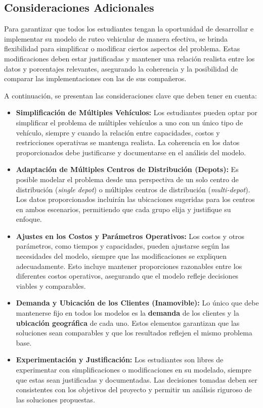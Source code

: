 \documentclass[12pt]{article}
\begin{document}
\subsection{Consideraciones Adicionales}

Para garantizar que todos los estudiantes tengan la oportunidad de desarrollar e implementar su modelo de ruteo vehicular de manera efectiva, se brinda flexibilidad para simplificar o modificar ciertos aspectos del problema. Estas modificaciones deben estar justificadas y mantener una relación realista entre los datos y porcentajes relevantes, asegurando la coherencia y la posibilidad de comparar las implementaciones con las de sus compañeros.

A continuación, se presentan las consideraciones clave que deben tener en cuenta:

\begin{itemize}
    \item \textbf{Simplificación de Múltiples Vehículos:}  
    Los estudiantes pueden optar por simplificar el problema de múltiples vehículos a uno con un único tipo de vehículo, siempre y cuando la relación entre capacidades, costos y restricciones operativas se mantenga realista. La coherencia en los datos proporcionados debe justificarse y documentarse en el análisis del modelo.
    
    \item \textbf{Adaptación de Múltiples Centros de Distribución (Depots):}  
    Es posible modelar el problema desde una perspectiva de un solo centro de distribución (\textit{single depot}) o múltiples centros de distribución (\textit{multi-depot}). Los datos proporcionados incluirán las ubicaciones sugeridas para los centros en ambos escenarios, permitiendo que cada grupo elija y justifique su enfoque.

    \item \textbf{Ajustes en los Costos y Parámetros Operativos:}  
    Los costos y otros parámetros, como tiempos y capacidades, pueden ajustarse según las necesidades del modelo, siempre que las modificaciones se expliquen adecuadamente. Esto incluye mantener proporciones razonables entre los diferentes costos operativos, asegurando que el modelo refleje decisiones viables y comparables.

    \item \textbf{Demanda y Ubicación de los Clientes (Inamovible):}  
    Lo único que debe mantenerse fijo en todos los modelos es la \textbf{demanda} de los clientes y la \textbf{ubicación geográfica} de cada uno. Estos elementos garantizan que las soluciones sean comparables y que los resultados reflejen el mismo problema base.

    \item \textbf{Experimentación y Justificación:}  
    Los estudiantes son libres de experimentar con simplificaciones o modificaciones en su modelado, siempre que estas sean justificadas y documentadas. Las decisiones tomadas deben ser consistentes con los objetivos del proyecto y permitir un análisis riguroso de las soluciones propuestas.
\end{itemize}
\end{document}
